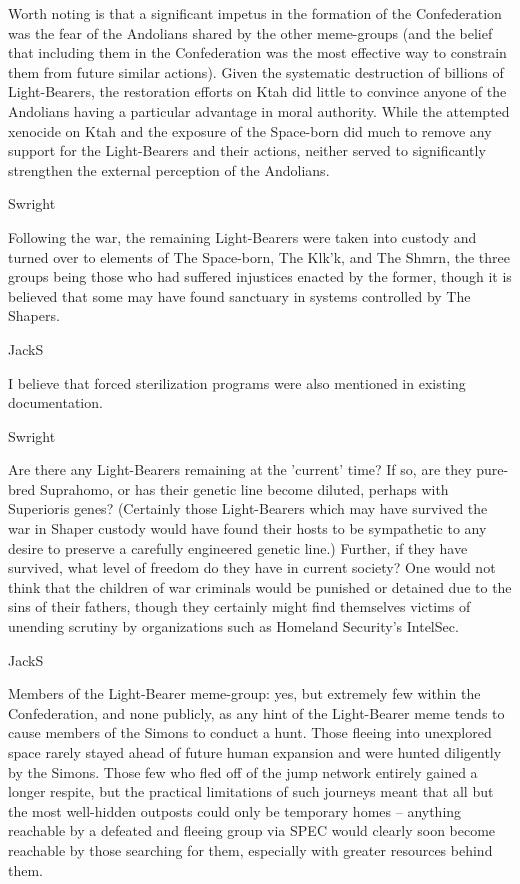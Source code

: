 Worth noting is that a significant impetus in the formation of the
Confederation was the fear of the Andolians shared by the other
meme-groups (and the belief that including them in the Confederation
was the most effective way to constrain them from future similar
actions). Given the systematic destruction of billions of
Light-Bearers, the restoration efforts on Ktah did little to convince
anyone of the Andolians having a particular advantage in moral
authority. While the attempted xenocide on Ktah and the exposure of
the Space-born did much to remove any support for the Light-Bearers
and their actions, neither served to significantly strengthen the
external perception of the Andolians.

Swright

Following the war, the remaining Light-Bearers were taken into custody
and turned over to elements of The Space-born, The Klk'k, and The
Shmrn, the three groups being those who had suffered injustices
enacted by the former, though it is believed that some may have found
sanctuary in systems controlled by The Shapers.

JackS

I believe that forced sterilization programs were also mentioned in
existing documentation.

Swright

Are there any Light-Bearers remaining at the 'current' time? If so,
are they pure-bred Suprahomo, or has their genetic line become
diluted, perhaps with Superioris genes? (Certainly those Light-Bearers
which may have survived the war in Shaper custody would have found
their hosts to be sympathetic to any desire to preserve a carefully
engineered genetic line.) Further, if they have survived, what level
of freedom do they have in current society? One would not think that
the children of war criminals would be punished or detained due to the
sins of their fathers, though they certainly might find themselves
victims of unending scrutiny by organizations such as Homeland
Security's IntelSec.

JackS
	
Members of the Light-Bearer meme-group: yes, but extremely few within
the Confederation, and none publicly, as any hint of the Light-Bearer
meme tends to cause members of the Simons to conduct a hunt. Those
fleeing into unexplored space rarely stayed ahead of future human
expansion and were hunted diligently by the Simons. Those few who fled
off of the jump network entirely gained a longer respite, but the
practical limitations of such journeys meant that all but the most
well-hidden outposts could only be temporary homes -- anything
reachable by a defeated and fleeing group via SPEC would clearly soon
become reachable by those searching for them, especially with greater
resources behind them.

